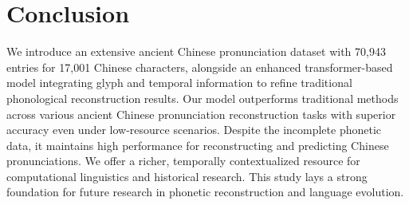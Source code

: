 \section{Conclusion}
We introduce an extensive ancient Chinese pronunciation dataset with 70,943 entries for 17,001 Chinese characters, alongside an enhanced transformer-based model integrating glyph and temporal information to refine traditional phonological reconstruction results. Our model outperforms traditional methods across various ancient Chinese pronunciation reconstruction tasks with superior accuracy even under low-resource scenarios. Despite the incomplete phonetic data, it maintains high performance for reconstructing and predicting Chinese pronunciations.
We offer a richer, temporally contextualized resource for computational linguistics and historical research. This study lays a strong foundation for future research in phonetic reconstruction and language evolution.